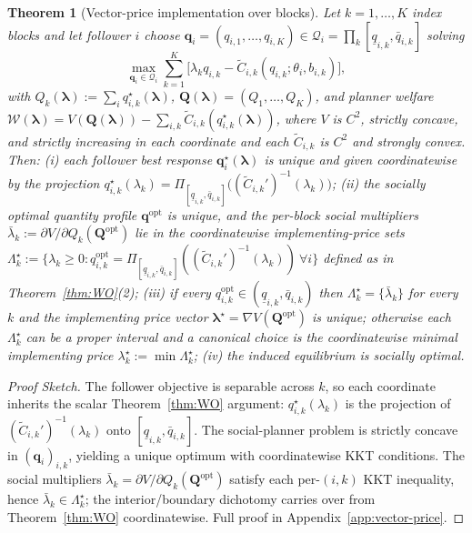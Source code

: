 \documentclass{article}
\newtheorem{theorem}{Theorem}
\begin{document}
\begin{theorem}[Vector-price implementation over blocks]
    \label{thm:vector-price}
    Let $k = 1,\ldots,K$ index blocks and let follower $i$ choose $\mathbf{q}_i = (q_{i,1},\ldots,q_{i,K}) \in \mathcal Q_i = \prod_k [\underline q_{i,k}, \bar q_{i,k}]$ solving
    $$\max_{\mathbf q_i \in \mathcal Q_i} \sum_{k=1}^K \big[\lambda_k q_{i,k} - \widetilde C_{i,k}(q_{i,k}; \theta_i, b_{i,k})\big],$$
    with $Q_k(\boldsymbol\lambda) := \sum_i q_{i,k}^\star(\boldsymbol\lambda)$, $\mathbf{Q}(\boldsymbol\lambda) = (Q_1,\ldots,Q_K)$, and planner welfare $\mathcal{W}(\boldsymbol\lambda) = V(\mathbf Q(\boldsymbol\lambda)) - \sum_{i,k} \widetilde C_{i,k}(q_{i,k}^\star(\boldsymbol\lambda))$, where $V$ is $C^2$, strictly concave, and strictly increasing in each coordinate and each $\widetilde C_{i,k}$ is $C^2$ and strongly convex. Then: (i) each follower best response $\mathbf q_i^\star(\boldsymbol\lambda)$ is unique and given coordinatewise by the projection $q_{i,k}^\star(\lambda_k) = \Pi_{[\underline q_{i,k}, \bar q_{i,k}]}\!\big((\widetilde C_{i,k}')^{-1}(\lambda_k)\big)$; (ii) the socially optimal quantity profile $\mathbf q^{\mathrm{opt}}$ is unique, and the per-block social multipliers $\bar\lambda_k := \partial V/\partial Q_k(\mathbf Q^{\mathrm{opt}})$ lie in the coordinatewise implementing-price sets $\Lambda_k^\star := \{\lambda_k \ge 0 : q_{i,k}^{\mathrm{opt}} = \Pi_{[\underline q_{i,k}, \bar q_{i,k}]}((\widetilde C_{i,k}')^{-1}(\lambda_k))\ \forall i\}$ defined as in Theorem~\ref{thm:WO}(2); (iii) if every $q_{i,k}^{\mathrm{opt}} \in (\underline q_{i,k}, \bar q_{i,k})$ then $\Lambda_k^\star = \{\bar\lambda_k\}$ for every $k$ and the implementing price vector $\boldsymbol\lambda^\star = \nabla V(\mathbf Q^{\mathrm{opt}})$ is unique; otherwise each $\Lambda_k^\star$ can be a proper interval and a canonical choice is the coordinatewise minimal implementing price $\lambda_k^\star := \min \Lambda_k^\star$; (iv) the induced equilibrium is socially optimal.
\end{theorem}
\begin{proof}
    [Proof Sketch]
    The follower objective is separable across $k$, so each coordinate inherits the scalar Theorem~\ref{thm:WO} argument: $q_{i,k}^\star(\lambda_k)$ is the projection of $(\widetilde C_{i,k}')^{-1}(\lambda_k)$ onto $[\underline q_{i,k}, \bar q_{i,k}]$. The social-planner problem is strictly concave in $(\mathbf q_i)_{i,k}$, yielding a unique optimum with coordinatewise KKT conditions. The social multipliers $\bar\lambda_k = \partial V/\partial Q_k(\mathbf Q^{\mathrm{opt}})$ satisfy each per-$(i,k)$ KKT inequality, hence $\bar\lambda_k \in \Lambda_k^\star$; the interior/boundary dichotomy carries over from Theorem~\ref{thm:WO} coordinatewise. Full proof in Appendix~\ref{app:vector-price}.
\end{proof}
\end{document}
